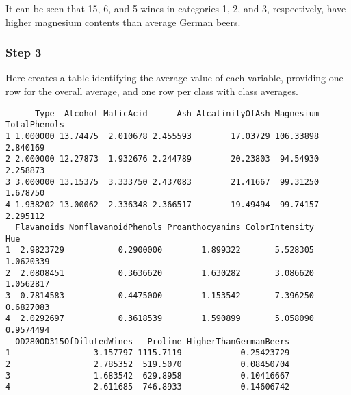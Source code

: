 \documentclass[
  letterpaper,
  DIV=11,
  numbers=noendperiod]{scrartcl}
\newenvironment{Shaded}{\begin{snugshade}}{\end{snugshade}}
\newcommand{\AttributeTok}[1]{\textcolor[rgb]{0.40,0.45,0.13}{#1}}
\newcommand{\CommentTok}[1]{\textcolor[rgb]{0.37,0.37,0.37}{#1}}
\newcommand{\DecValTok}[1]{\textcolor[rgb]{0.68,0.00,0.00}{#1}}
\newcommand{\FunctionTok}[1]{\textcolor[rgb]{0.28,0.35,0.67}{#1}}
\newcommand{\NormalTok}[1]{\textcolor[rgb]{0.00,0.23,0.31}{#1}}
\newcommand{\OtherTok}[1]{\textcolor[rgb]{0.00,0.23,0.31}{#1}}
\newcommand{\SpecialCharTok}[1]{\textcolor[rgb]{0.37,0.37,0.37}{#1}}
\begin{document}
It can be seen that 15, 6, and 5 wines in categories 1, 2, and 3,
respectively, have higher magnesium contents than average German beers.

\hypertarget{step-3}{%
\subsubsection{Step 3}\label{step-3}}

Here creates a table identifying the average value of each variable,
providing one row for the overall average, and one row per class with
class averages.

\begin{Shaded}
\end{Shaded}

\begin{verbatim}
      Type  Alcohol MalicAcid      Ash AlcalinityOfAsh Magnesium TotalPhenols
1 1.000000 13.74475  2.010678 2.455593        17.03729 106.33898     2.840169
2 2.000000 12.27873  1.932676 2.244789        20.23803  94.54930     2.258873
3 3.000000 13.15375  3.333750 2.437083        21.41667  99.31250     1.678750
4 1.938202 13.00062  2.336348 2.366517        19.49494  99.74157     2.295112
  Flavanoids NonflavanoidPhenols Proanthocyanins ColorIntensity       Hue
1  2.9823729           0.2900000        1.899322       5.528305 1.0620339
2  2.0808451           0.3636620        1.630282       3.086620 1.0562817
3  0.7814583           0.4475000        1.153542       7.396250 0.6827083
4  2.0292697           0.3618539        1.590899       5.058090 0.9574494
  OD280OD315OfDilutedWines   Proline HigherThanGermanBeers
1                 3.157797 1115.7119            0.25423729
2                 2.785352  519.5070            0.08450704
3                 1.683542  629.8958            0.10416667
4                 2.611685  746.8933            0.14606742
\end{verbatim}
\end{document}
